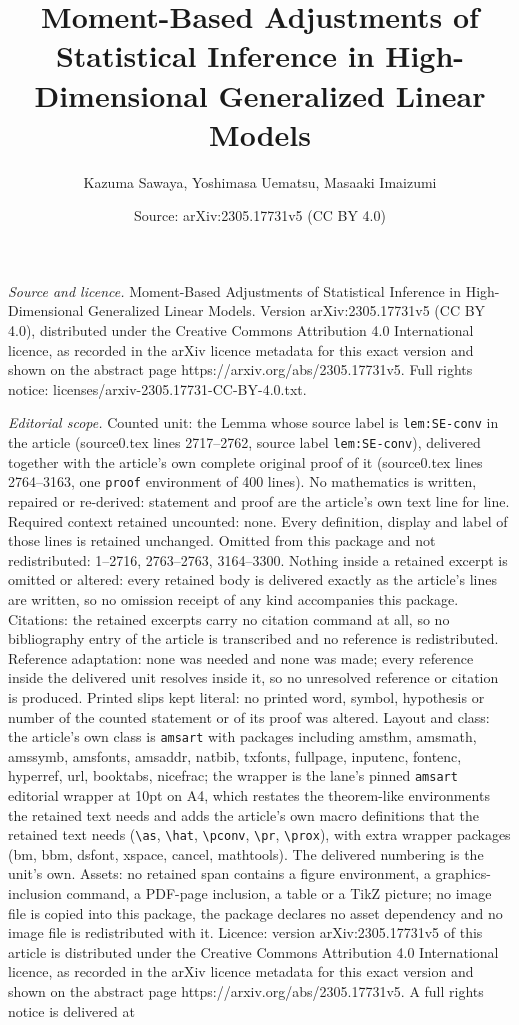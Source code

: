 \documentclass[10pt,a4paper]{amsart}
\title[Moment-Based Adjustments of Statistical Inference in High-Di]{Moment-Based Adjustments of Statistical Inference in High-Dimensional Generalized Linear Models}
\author{Kazuma Sawaya, Yoshimasa Uematsu, Masaaki Imaizumi}
\date{Source: arXiv:2305.17731v5 (CC BY 4.0)}
\begin{document}
\maketitle

\noindent\emph{Source and licence.} Moment-Based Adjustments of Statistical Inference in High-Dimensional Generalized Linear Models. Version arXiv:2305.17731v5 (CC BY 4.0), distributed under the Creative Commons Attribution 4.0 International licence, as recorded in the arXiv licence metadata for this exact version and shown on the abstract page https://arxiv.org/abs/2305.17731v5. Full rights notice: licenses/arxiv-2305.17731-CC-BY-4.0.txt.\par\smallskip

\noindent\textit{Editorial scope.} Counted unit: the Lemma whose source label is \texttt{lem:SE-conv} in the article (source0.tex lines 2717--2762, source label \texttt{lem:SE-conv}), delivered together with the article's own complete original proof of it (source0.tex lines 2764--3163, one \texttt{proof} environment of 400 lines). No mathematics is written, repaired or re-derived: statement and proof are the article's own text line for line. Required context retained uncounted: none. Every definition, display and label of those lines is retained unchanged. Omitted from this package and not redistributed: 1--2716, 2763--2763, 3164--3300. Nothing inside a retained excerpt is omitted or altered: every retained body is delivered exactly as the article's lines are written, so no omission receipt of any kind accompanies this package. Citations: the retained excerpts carry no citation command at all, so no bibliography entry of the article is transcribed and no reference is redistributed. Reference adaptation: none was needed and none was made; every reference inside the delivered unit resolves inside it, so no unresolved reference or citation is produced. Printed slips kept literal: no printed word, symbol, hypothesis or number of the counted statement or of its proof was altered. Layout and class: the article's own class is \texttt{amsart} with packages including amsthm, amsmath, amssymb, amsfonts, amsaddr, natbib, txfonts, fullpage, inputenc, fontenc, hyperref, url, booktabs, nicefrac; the wrapper is the lane's pinned \texttt{amsart} editorial wrapper at 10pt on A4, which restates the theorem-like environments the retained text needs and adds the article's own macro definitions that the retained text needs (\texttt{\textbackslash as}, \texttt{\textbackslash hat}, \texttt{\textbackslash pconv}, \texttt{\textbackslash pr}, \texttt{\textbackslash prox}), with extra wrapper packages (bm, bbm, dsfont, xspace, cancel, mathtools). The delivered numbering is the unit's own. Assets: no retained span contains a figure environment, a graphics-inclusion command, a PDF-page inclusion, a table or a TikZ picture; no image file is copied into this package, the package declares no asset dependency and no image file is redistributed with it. Licence: version arXiv:2305.17731v5 of this article is distributed under the Creative Commons Attribution 4.0 International licence, as recorded in the arXiv licence metadata for this exact version and shown on the abstract page https://arxiv.org/abs/2305.17731v5. A full rights notice is delivered at 
\end{document}
